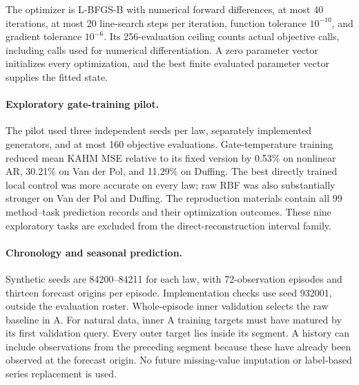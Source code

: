 The optimizer is L-BFGS-B with numerical forward differences, at most
40 iterations, at most 20 line-search steps per iteration, function
tolerance $10^{-10}$, and gradient tolerance $10^{-6}$. Its 256-evaluation
ceiling counts actual objective calls, including calls used for numerical
differentiation. A zero parameter vector initializes every optimization,
and the best finite evaluated parameter vector supplies the fitted state.

\paragraph{Exploratory gate-training pilot.}
The pilot used three independent seeds per law, separately implemented
generators, and at most 160 objective evaluations. Gate-temperature
training reduced mean KAHM MSE relative to its fixed version by 0.53\%
on nonlinear AR, 30.21\% on Van der Pol, and 11.29\% on Duffing. The
best directly trained local control was more accurate on every law;
raw RBF was also substantially stronger on Van der Pol and Duffing.
The reproduction materials contain all 99 method--task prediction
records and their optimization outcomes. These nine exploratory tasks
are excluded from the direct-reconstruction interval family.

\paragraph{Chronology and seasonal prediction.}
Synthetic seeds are 84200--84211 for each law, with
72-observation episodes and thirteen forecast origins per episode.
Implementation checks use seed 932001, outside the evaluation roster.
Whole-episode inner validation selects the raw baseline in A. For natural
data, inner A training targets must have matured by its first
validation query. Every outer target lies inside its segment. A history
can include observations from the preceding segment because these have
already been observed at the forecast origin. No future missing-value
imputation or label-based series replacement is used.

